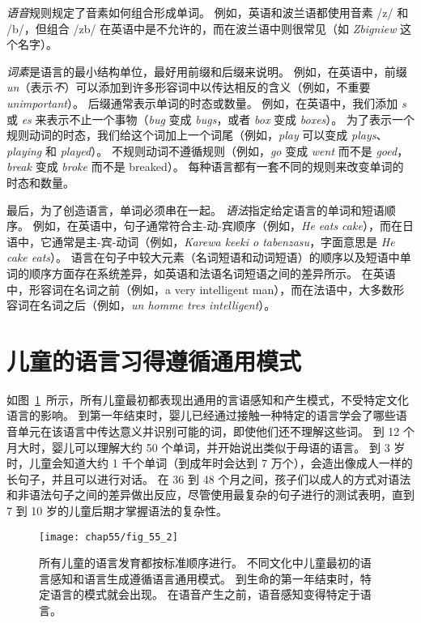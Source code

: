 \textit{语音}规则规定了音素如何组合形成单词。
例如，英语和波兰语都使用音素 /z/ 和 /b/，但组合 /zb/ 在英语中是不允许的，而在波兰语中则很常见（如 \textit{Zbigniew} 这个名字）。


\textit{词素}是语言的最小结构单位，最好用前缀和后缀来说明。
例如，在英语中，前缀 \textit{un}（表示\textit{不}）可以添加到许多形容词中以传达相反的含义（例如，不重要\textit{unimportant}）。
后缀通常表示单词的时态或数量。
例如，在英语中，我们添加 \textit{s} 或 \textit{es} 来表示不止一个事物（\textit{bug} 变成 \textit{bugs}，或者 \textit{box} 变成 \textit{boxes}）。
为了表示一个规则动词的时态，我们给这个词加上一个词尾（例如，\textit{play} 可以变成 \textit{plays}、\textit{playing} 和 \textit{played}）。
不规则动词不遵循规则（例如，\textit{go} 变成 \textit{went} 而不是 \textit{goed}，\textit{break} 变成 \textit{broke} 而不是 breaked）。
每种语言都有一套不同的规则来改变单词的时态和数量。


最后，为了创造语言，单词必须串在一起。
\textit{语法}指定给定语言的单词和短语顺序。
例如，在英语中，句子通常符合主-动-宾顺序（例如，\textit{He eats cake}），而在日语中，它通常是主-宾-动词（例如，\textit{Karewa keeki o tabenzasu}，字面意思是 \textit{He cake eats}）。
语言在句子中较大元素（名词短语和动词短语）的顺序以及短语中单词的顺序方面存在系统差异，如英语和法语名词短语之间的差异所示。
在英语中，形容词在名词之前（例如，a very intelligent man），而在法语中，大多数形容词在名词之后（例如，\textit{un homme tres intelligent}）。



\section{儿童的语言习得遵循通用模式}

如图~\ref{fig:55_2}~所示，所有儿童最初都表现出通用的言语感知和产生模式，不受特定文化语言的影响。
到第一年结束时，婴儿已经通过接触一种特定的语言学会了哪些语音单元在该语言中传达意义并识别可能的词，即使他们还不理解这些词。
到 12 个月大时，婴儿可以理解大约 50 个单词，并开始说出类似于母语的语言。
到 3 岁时，儿童会知道大约 1 千个单词（到成年时会达到 7 万个），会造出像成人一样的长句子，并且可以进行对话。
在 36 到 48 个月之间，孩子们以成人的方式对语法和非语法句子之间的差异做出反应，尽管使用最复杂的句子进行的测试表明，直到 7 到 10 岁的儿童后期才掌握语法的复杂性。


\begin{figure}[htbp]
	\centering
	\texttt{[image: chap55/fig\_55\_2]}
	\caption{所有儿童的语言发育都按标准顺序进行。
		不同文化中儿童最初的语言感知和语言生成遵循语言通用模式。
		到生命的第一年结束时，特定语言的模式就会出现。
		在语音产生之前，语音感知变得特定于语言\cite{doupe1999birdsong}。
	}
	\label{fig:55_2}
\end{figure}


